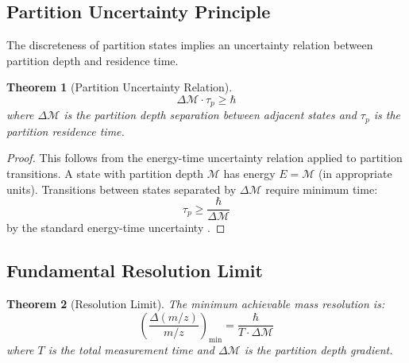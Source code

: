 \documentclass[twocolumn,10pt,a4paper]{article}
\newtheorem{theorem}{Theorem}[section]
\theoremstyle{definition}
\theoremstyle{remark}
\newcommand{\Mdepth}{\mathcal{M}}
\newcommand{\taup}{\tau_p}
\begin{document}
\subsection{Partition Uncertainty Principle}

The discreteness of partition states implies an uncertainty relation between partition depth and residence time.

\begin{theorem}[Partition Uncertainty Relation]
\label{thm:uncertainty}
\begin{equation}
    \boxed{\Delta\Mdepth \cdot \taup \geq \hbar}
    \label{eq:partition_uncertainty}
\end{equation}
where $\Delta\Mdepth$ is the partition depth separation between adjacent states and $\taup$ is the partition residence time.
\end{theorem}

\begin{proof}
This follows from the energy-time uncertainty relation applied to partition transitions. A state with partition depth $\Mdepth$ has energy $E = \Mdepth$ (in appropriate units). Transitions between states separated by $\Delta\Mdepth$ require minimum time:
\begin{equation}
    \taup \geq \frac{\hbar}{\Delta\Mdepth}
\end{equation}
by the standard energy-time uncertainty \citep{mandelstam1991}.
\end{proof}

\subsection{Fundamental Resolution Limit}

\begin{theorem}[Resolution Limit]
\label{thm:resolution}
The minimum achievable mass resolution is:
\begin{equation}
    \boxed{\left(\frac{\Delta(m/z)}{m/z}\right)_{\min} = \frac{\hbar}{T \cdot \Delta\Mdepth}}
    \label{eq:resolution_limit}
\end{equation}
where $T$ is the total measurement time and $\Delta\Mdepth$ is the partition depth gradient.
\end{theorem}
\end{document}
